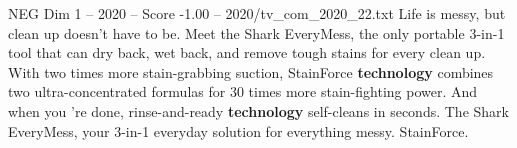 \begin{textsample}{NEG Dim 1 – 2020 – Score -1.00 – 2020/tv\_com\_2020\_22.txt}  \label{ex:f1_neg_009}
Life is messy, but clean up doesn't have to be.
Meet the Shark EveryMess, the only portable 3-in-1 tool that can dry back, wet back, and remove tough stains for every clean up.
With two times more stain-grabbing suction, StainForce \textbf{technology} combines two ultra-concentrated formulas for 30 times more stain-fighting power.
And when you 're done, rinse-and-ready \textbf{technology} self-cleans in seconds.
The Shark EveryMess, your 3-in-1 everyday solution for everything messy.
StainForce.

\end{textsample}
